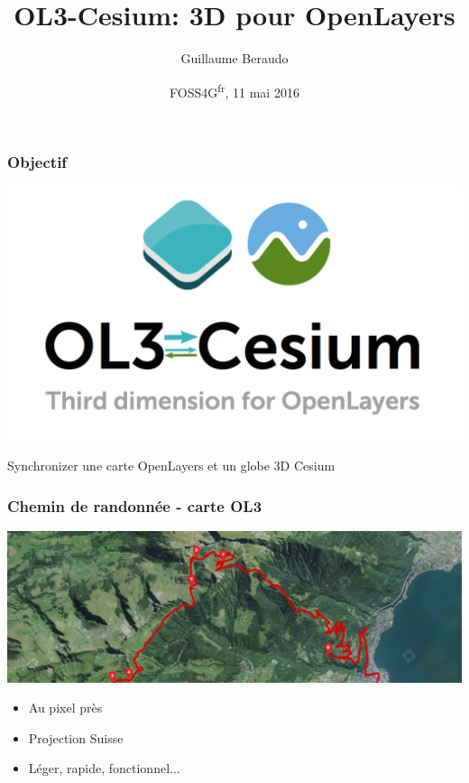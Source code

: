 \documentclass[handout]{beamer}
\title{OL3-Cesium: 3D pour OpenLayers}
\author{Guillaume Beraudo}
\institute{Ingénieur Opensource \\Camptocamp, Suisse}
\date{FOSS4G\textsuperscript{fr}, 11 mai 2016}
\begin{document}
  \begin{frame}
    \titlepage
  \end{frame}

  \begin{frame}
       \frametitle{Objectif}
    \begin{center}
        \includegraphics[width=.3\linewidth]{./ol3-cesium-wide_arrows.png}
    \end{center}

\begin{center}
    Synchronizer une carte OpenLayers et un globe 3D Cesium
\end{center}
\end{frame}


  \begin{frame}
    \frametitle{Chemin de randonnée - carte OL3}
	\begin{center}
	  \includegraphics[width=1.0 \linewidth]{./vtt_2d_half.png}
	\end{center}

	\pause
	\begin{itemize}
      \item Au pixel près
      \item Projection Suisse
      \item Léger, rapide, fonctionnel...
    \end{itemize}
  \end{frame}
 
\end{document}
